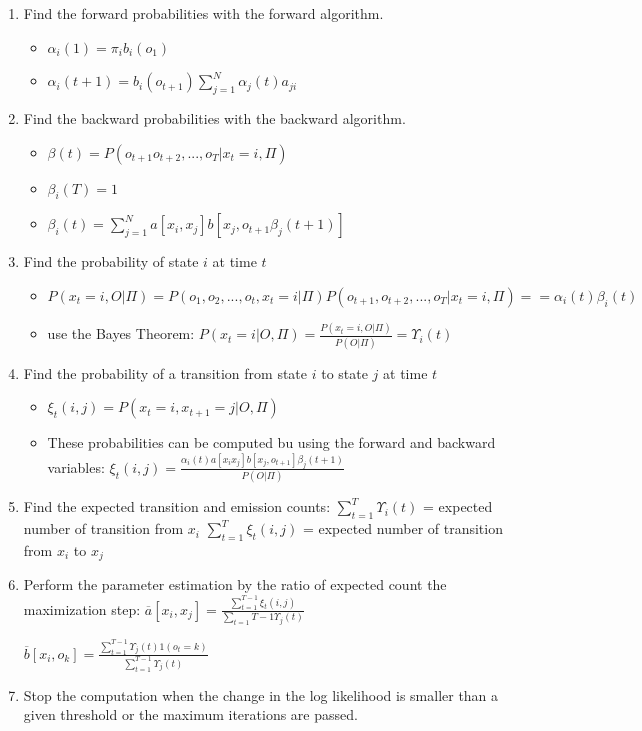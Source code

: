 \begin{enumerate}
\item Find the forward probabilities with the forward algorithm.
\begin{itemize}
\item $\alpha_{i}(1) = \pi_{i} b_{i} (o_{1})$
\item $\alpha_{i}(t + 1) = b_{i}(o_{t+1}) \sum\limits^{N}_{j=1}\alpha_{j}(t)a_{ji}$
\end{itemize}
\item Find the backward probabilities with the backward algorithm.
\begin{itemize}
\item $\beta(t) = P(o_{t+1} o_{t+2},...,o_{T} | x_{t} = i, \Pi) $
\item $\beta_{i}(T) = 1$
\item $\beta_{i}(t) = \sum\limits^{N}_{j=1} a[x_i, x_j] b[x_j,o_{t + 1}\beta_{j}(t + 1)]$
\end{itemize}
\item Find the probability of state $i$ at time $t$
\begin{itemize}
\item $P (x_t = i, O | \Pi) = P (o_1, o_2,...,o_t, x_t = i | \Pi) P (o_{t + 1}, o_{t + 2},...,o_{T} | x_{t} = i, \Pi) == \alpha_{i}(t) \beta_{i}(t) $
\item use the Bayes Theorem:
$P(x_t = i | O, \Pi) = \frac{P(x_t = i, O | \Pi)}{P(O | \Pi)} = \Upsilon_{i}(t)$
\end{itemize}
\item Find the probability of a transition from state $i$ to state $j$ at time $t$
\begin{itemize}
\item $\xi_{t}(i,j) = P (x_t = i,x_{t + 1} = j | O, \Pi)$
\item These probabilities can be computed bu using the forward and backward variables:
$\xi_{t}(i,j) = \frac{\alpha_i (t) a[x_i x_j] b[x_j,o_{t + 1}] \beta_j (t + 1)   }{P(O | \Pi)}$
\end{itemize}
\item Find the expected transition and emission counts:
$\sum\limits_{t = 1}^{ T } \Upsilon_i (t)$ = expected number of transition from $x_i$
$\sum\limits_{t = 1}^{ T} \xi_t (i ,j)$ = expected number of transition from $x_i$ to $x_j$
\item Perform the parameter estimation by the ratio of expected count the maximization step:
$\overline{a}[x_i, x_j] = \frac{\sum\limits_{t = 1}^{T - 1}\xi_{t} (i, j)}{\sum\limits_{t = 1} T - 1 \Upsilon_{j}(t)} $

$\overline{b}[x_i, o_k] = \frac{\sum\limits_{t = 1}^{T - 1}\Upsilon_{j} (t) 1 (o_t = k)}{\sum\limits_{t = 1}^{T - 1} \Upsilon_{j}(t)} $
\item Stop the computation when the change in the log likelihood is smaller than a given threshold or the maximum iterations are passed.
\end{enumerate} 



